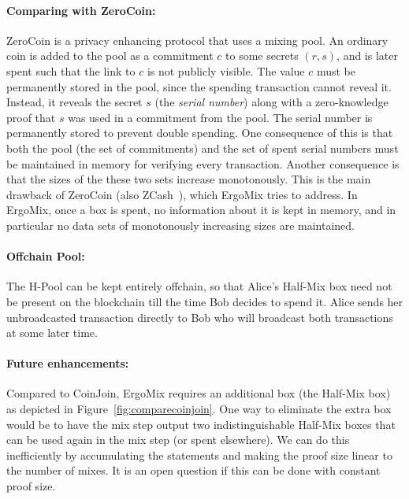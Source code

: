 \documentclass[11pt]{article}
\newcommand{\mixname}{ErgoMix\xspace}
\begin{document}
\paragraph{Comparing with ZeroCoin:} ZeroCoin is a privacy enhancing protocol that uses a mixing pool. An ordinary coin is added to the pool as a commitment $c$ to some secrets $(r, s)$, and is later spent such that the link to $c$ is not publicly visible. The value $c$ must be permanently stored in the pool, since the spending transaction cannot reveal it. Instead, it reveals the secret $s$ (the {\em serial number}) along with a zero-knowledge proof that $s$ was used in a commitment from the pool. The serial number is permanently stored to prevent double spending. One consequence of this is that both the pool (the set of commitments) and the set of spent serial numbers must be maintained in memory for verifying every transaction. Another consequence is that the sizes of the these two sets increase monotonously.
This is the main drawback of ZeroCoin (also ZCash~\cite{zcash}), which \mixname tries to address. 
In \mixname, once a box is spent, no information about it is kept in memory, and in particular no data sets of monotonously increasing sizes are maintained. 


\paragraph{Offchain Pool:} The H-Pool can be kept entirely offchain, so that Alice's Half-Mix box need not be present on the blockchain till the time Bob decides to spend it. Alice sends her unbroadcasted transaction directly to Bob who will broadcast both transactions at some later time. 


\paragraph{Future enhancements:} Compared to CoinJoin, \mixname requires an additional box (the Half-Mix box) as depicted in Figure~\ref{fig:comparecoinjoin}. One way to eliminate the extra box would be to have the mix step output two indistinguishable Half-Mix boxes that can be used again in the mix step (or spent elsewhere). 
We can do this inefficiently by accumulating the statements and making the proof size linear to the number of mixes. It is an open question if this can be done with constant proof size.
\end{document}
